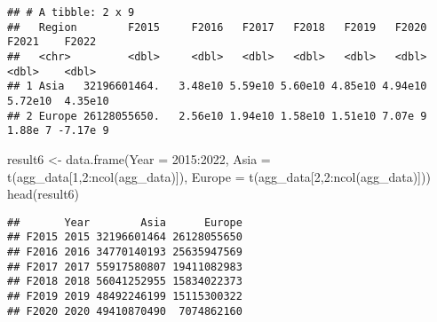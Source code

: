 \documentclass[
]{article}
\newenvironment{Shaded}{\begin{snugshade}}{\end{snugshade}}
\newcommand{\AttributeTok}[1]{\textcolor[rgb]{0.77,0.63,0.00}{#1}}
\newcommand{\DecValTok}[1]{\textcolor[rgb]{0.00,0.00,0.81}{#1}}
\newcommand{\FunctionTok}[1]{\textcolor[rgb]{0.00,0.00,0.00}{#1}}
\newcommand{\NormalTok}[1]{#1}
\newcommand{\OtherTok}[1]{\textcolor[rgb]{0.56,0.35,0.01}{#1}}
\newcommand{\SpecialCharTok}[1]{\textcolor[rgb]{0.00,0.00,0.00}{#1}}
\newcommand{\StringTok}[1]{\textcolor[rgb]{0.31,0.60,0.02}{#1}}
\begin{document}
\begin{verbatim}
## # A tibble: 2 x 9
##   Region        F2015     F2016   F2017   F2018   F2019   F2020   F2021    F2022
##   <chr>         <dbl>     <dbl>   <dbl>   <dbl>   <dbl>   <dbl>   <dbl>    <dbl>
## 1 Asia   32196601464.   3.48e10 5.59e10 5.60e10 4.85e10 4.94e10 5.72e10  4.35e10
## 2 Europe 26128055650.   2.56e10 1.94e10 1.58e10 1.51e10 7.07e 9 1.88e 7 -7.17e 9
\end{verbatim}

\begin{Shaded}
\begin{Highlighting}[]
\NormalTok{result6 }\OtherTok{\textless{}{-}} \FunctionTok{data.frame}\NormalTok{(}\AttributeTok{Year =} \DecValTok{2015}\SpecialCharTok{:}\DecValTok{2022}\NormalTok{, }
                      \StringTok{\textquotesingle{}Asia\textquotesingle{}} \OtherTok{=} \FunctionTok{t}\NormalTok{(agg\_data[}\DecValTok{1}\NormalTok{,}\DecValTok{2}\SpecialCharTok{:}\FunctionTok{ncol}\NormalTok{(agg\_data)]), }
                      \StringTok{\textquotesingle{}Europe\textquotesingle{}} \OtherTok{=} \FunctionTok{t}\NormalTok{(agg\_data[}\DecValTok{2}\NormalTok{,}\DecValTok{2}\SpecialCharTok{:}\FunctionTok{ncol}\NormalTok{(agg\_data)]))}
\FunctionTok{head}\NormalTok{(result6)}
\end{Highlighting}
\end{Shaded}

\begin{verbatim}
##       Year        Asia      Europe
## F2015 2015 32196601464 26128055650
## F2016 2016 34770140193 25635947569
## F2017 2017 55917580807 19411082983
## F2018 2018 56041252955 15834022373
## F2019 2019 48492246199 15115300322
## F2020 2020 49410870490  7074862160
\end{verbatim}
\end{document}
